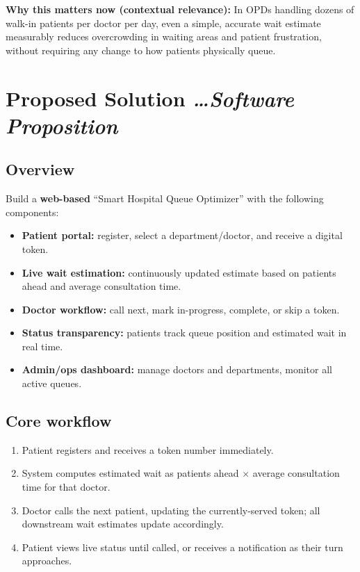 \documentclass[11pt,a4paper]{article}
\newcommand{\BvrHint}[1]{%
  {\normalfont\normalsize\itshape\hfill #1}}
\begin{document}
\textbf{Why this matters now (contextual relevance):} In OPDs handling dozens of walk-in patients per doctor per day, even a simple, accurate wait estimate measurably reduces overcrowding in waiting areas and patient frustration, without requiring any change to how patients physically queue.

\section{Proposed Solution %
\BvrHint{\ldots Software Proposition}}
\subsection{Overview}
Build a \textbf{web-based} ``Smart Hospital Queue Optimizer'' with the following components:
\begin{itemize}[leftmargin=0.7cm]
    \item \textbf{Patient portal:} register, select a department/doctor, and receive a digital token.
    \item \textbf{Live wait estimation:} continuously updated estimate based on patients ahead and average consultation time.
    \item \textbf{Doctor workflow:} call next, mark in-progress, complete, or skip a token.
    \item \textbf{Status transparency:} patients track queue position and estimated wait in real time.
    \item \textbf{Admin/ops dashboard:} manage doctors and departments, monitor all active queues.
\end{itemize}

\subsection{Core workflow}
\begin{enumerate}[leftmargin=0.7cm]
    \item Patient registers and receives a token number immediately.
    \item System computes estimated wait as patients ahead $\times$ average consultation time for that doctor.
    \item Doctor calls the next patient, updating the currently-served token; all downstream wait estimates update accordingly.
    \item Patient views live status until called, or receives a notification as their turn approaches.
\end{enumerate}
\end{document}
